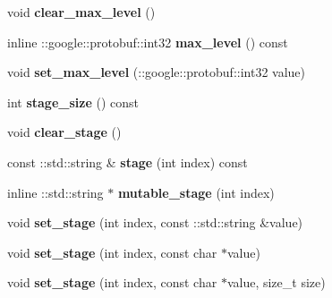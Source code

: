 \begin{DoxyCompactItemize}
\mbox{\label{classcaffe_1_1_net_state_rule_a02201681dbe54e2d2d02a94d7841fccf}} 
void {\bfseries clear\+\_\+max\+\_\+level} ()
\item 
\mbox{\label{classcaffe_1_1_net_state_rule_a29b231a5fcfd1c0f7036f90829fd34b6}} 
inline \+::google\+::protobuf\+::int32 {\bfseries max\+\_\+level} () const
\item 
\mbox{\label{classcaffe_1_1_net_state_rule_adcea8e21e7ae589ad3316eaf07c51228}} 
void {\bfseries set\+\_\+max\+\_\+level} (\+::google\+::protobuf\+::int32 value)
\item 
\mbox{\label{classcaffe_1_1_net_state_rule_aa665f1841fa642b0d0b0527dd37dbf31}} 
int {\bfseries stage\+\_\+size} () const
\item 
\mbox{\label{classcaffe_1_1_net_state_rule_ae6a7cd27ce34d90988731d9adc37b445}} 
void {\bfseries clear\+\_\+stage} ()
\item 
\mbox{\label{classcaffe_1_1_net_state_rule_a41f9b0b49e0aaae5d7c4f27f4cd71a94}} 
const \+::std\+::string \& {\bfseries stage} (int index) const
\item 
\mbox{\label{classcaffe_1_1_net_state_rule_a43832cce509426c8556d91a3aae75e19}} 
inline \+::std\+::string $\ast$ {\bfseries mutable\+\_\+stage} (int index)
\item 
\mbox{\label{classcaffe_1_1_net_state_rule_a11abbdfff3759dde9becc36de61fab10}} 
void {\bfseries set\+\_\+stage} (int index, const \+::std\+::string \&value)
\item 
\mbox{\label{classcaffe_1_1_net_state_rule_a8de20534f80e1c43f6341dab254dab80}} 
void {\bfseries set\+\_\+stage} (int index, const char $\ast$value)
\item 
\mbox{\label{classcaffe_1_1_net_state_rule_ae52ad02c76da933019b934b02dc02500}} 
void {\bfseries set\+\_\+stage} (int index, const char $\ast$value, size\+\_\+t size)

\end{DoxyCompactItemize}
